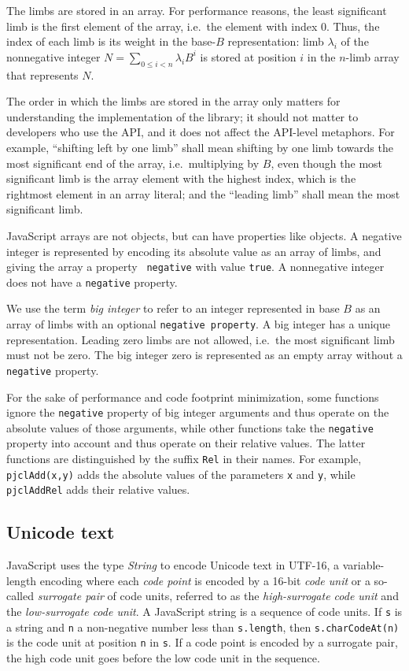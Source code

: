 \documentclass[12pt]{article}
\begin{document}
The limbs are stored in an array.
For performance reasons, the least significant limb is the first element of the array,
i.e.\ the element with index 0.
Thus, the index of each limb is its weight in the base-$B$
representation: limb $\lambda_i$ of the nonnegative integer $N =
\sum_{0 \leq i < n} \lambda_i B^i$ is stored at position
$i$ in the $n$-limb array that represents $N$.

The order in which the limbs are stored in the array only matters
for understanding the implementation of the library; it should not
matter to developers who use the API, and it does not affect the
API-level metaphors.  For example, ``shifting left by one limb'' shall
mean shifting by one limb towards the most significant end of the
array, i.e.\ multiplying by $B$, even though the most significant
limb is the array element with the highest index, which is the rightmost
element in an array literal; and the ``leading limb'' shall
mean the most significant limb.

JavaScript arrays are not objects, but can have properties like
objects.  A negative integer is represented by encoding its absolute
value as an array of limbs, and giving the array a property {\tt
  negative} with value {\tt true}.  A nonnegative integer does not
have a {\tt negative} property.

We use the term {\em big integer} to refer to an integer represented in base $B$ 
as an array of limbs with an optional {\tt negative property}.
A big integer has a unique representation.  Leading zero limbs are not
allowed, i.e.\ the most significant limb must not be zero.  The
big integer zero is represented as an empty array without a {\tt negative}
property.

For the sake of performance and code footprint minimization, some
functions ignore the {\tt negative} property of big integer arguments
and thus operate on the absolute values of those arguments, while
other functions take the {\tt negative} property into account and thus
operate on their relative values.  The latter functions are
distinguished by the suffix {\tt Rel} in their names.  For example,
{\tt pjclAdd(x,y)} adds the absolute values of the parameters {\tt x}
and {\tt y}, while {\tt pjclAddRel} adds their relative values.

\subsection{Unicode text}
\label{s:unicode}

JavaScript uses the type {\em String} to encode Unicode text in UTF-16, a variable-length 
encoding where each {\em code point\/} is encoded by 
a 16-bit {\em code unit\/} or a so-called {\em surrogate pair\/} of code units,
referred to as the {\em high-surrogate code unit\/} and the 
{\em low-surrogate code unit}.
A JavaScript string is a sequence of code units. If {\tt s} is a string and {\tt n} a non-negative number less than {\tt s.length}, then
{\tt s.charCodeAt(n)} is the code unit at position {\tt n} in {\tt s}. 
If a code point is encoded by a surrogate pair, the high code unit goes 
before the low code unit in the sequence.
\end{document}
